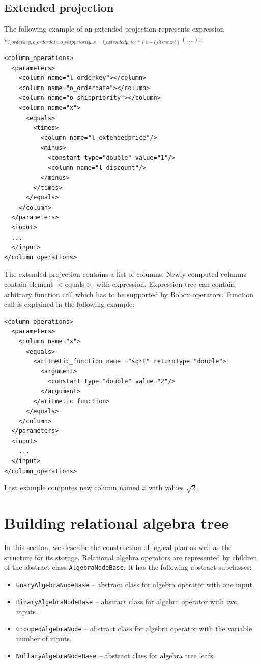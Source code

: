 \subsection{Extended projection}
The following example of an extended projection represents expression \\ $\pi_{l\_orderkey,o\_orderdate,o\_shippriority,x=l\_extendedprice*(1-l\_discount)}(...)$:
\begin{lstlisting}
<column_operations>
  <parameters>
    <column name="l_orderkey"></column>
    <column name="o_orderdate"></column>
    <column name="o_shippriority"></column>
    <column name="x">
      <equals>
        <times>
          <column name="l_extendedprice"/>
          <minus>
            <constant type="double" value="1"/>
            <column name="l_discount"/>
          </minus>
        </times>
      </equals>
    </column>
  </parameters>
  <input>
  ...
  </input>
</column_operations>
\end{lstlisting}

The extended projection contains a list of columns. Newly computed columns contain element $<$equals$>$ with expression. Expression tree can contain arbitrary function call which has to be supported by Bobox operators. Function call is explained in the following example:


\begin{lstlisting}
<column_operations>
  <parameters>
    <column name="x">
      <equals>
        <aritmetic_function name ="sqrt" returnType="double">
          <argument>
            <constant type="double" value="2"/>
          </argument>
        </aritmetic_function>
      </equals>
    </column>
  </parameters>
  <input>
    ...
  </input>
</column_operations>
\end{lstlisting}
 
Last example computes new column named $x$ with values $\sqrt{2}$.
 
\section{Building relational algebra tree} 

In this section, we describe the construction of logical plan as well as the structure for its storage. Relational algebra operators are represented by children of the abstract class \texttt{AlgebraNodeBase}. It has the following abstract subclasses:
\begin{itemize}

\item \texttt{UnaryAlgebraNodeBase} -- abstract class for algebra operator with one input.

\item \texttt{BinaryAlgebraNodeBase}  -- abstract class for algebra operator with two inputs.

\item \texttt{GroupedAlgebraNode} -- abstract class for algebra operator with the variable number of inputs.

\item \texttt{NullaryAlgebraNodeBase} --  abstract class for algebra tree leafs.

\end{itemize}

